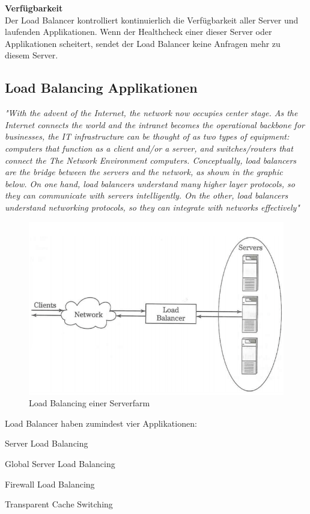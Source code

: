 \textbf{Verfügbarkeit} \\

Der Load Balancer kontrolliert kontinuierlich die Verfügbarkeit aller Server und laufenden Applikationen. Wenn der Healthcheck einer dieser Server oder Applikationen scheitert, sendet der Load Balancer keine Anfragen mehr zu diesem Server. \cite{LoadBalancing2}

\pagebreak
\subsection{Load Balancing Applikationen}
\label{sec:Load Balancing Applikationen}
\textit{"With the advent of the Internet, the network now occupies center stage. As the Internet connects the world and the intranet becomes the operational backbone for businesses, the IT infrastructure can be thought of as two types of equipment: computers that function as a client and/or a server, and switches/routers that connect the The Network Environment computers. Conceptually, load balancers are the bridge between the servers and the network, as shown in the graphic below. On one hand, load balancers understand many higher layer protocols, so they can communicate with servers intelligently. On the other, load balancers understand networking protocols, so they can integrate with networks effectively"}  \cite{LoadBalancing2}

\begin{figure}[!ht]
	\begin{center}
		\includegraphics[width=0.6\linewidth]{images/loadbalancing2.jpg}
		\caption{Load Balancing einer Serverfarm \cite{LoadBalancing2}}
		\label{Load Balancing einer Serverfarm}
	\end{center}
\end{figure}

Load Balancer haben zumindest vier Applikationen:
\begin{list}{•}{}
\item Server Load Balancing
\item Global Server Load Balancing
\item Firewall Load Balancing
\item Transparent Cache Switching
\end{list}

